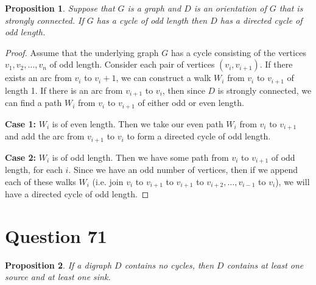 \documentclass[11pt, oneside]{article}   	%
\newtheorem{proposition}{Proposition}
\begin{document}
\begin{proposition}
Suppose that $G$ is a graph and $D$ is an orientation of $G$ that is strongly connected. If $G$ has a cycle of odd length then $D$ has a directed cycle of odd length.
\end{proposition}

\begin{proof}
Assume that the underlying graph $G$ has a cycle consisting of the vertices $v_1, v_2, \ldots, v_n$ of odd length. Consider each pair of vertices $(v_i, v_{i+1})$. If there exists an arc from $v_i$ to $v_i+1$, we can construct a walk $W_i$ from $v_i$ to $v_{i+1}$ of length 1. If there is an arc from $v_{i+1}$ to $v_i$, then since $D$ is strongly connected, we can find a path $W_i$ from $v_i$ to $v_{i+1}$ of either odd or even length.

\textbf{Case 1:} $W_i$ is of even length. Then we take our even path $W_i$ from $v_i$ to $v_{i+1}$ and add the arc from $v_{i+1}$ to $v_i$ to form a directed cycle of odd length.

\textbf{Case 2:} $W_i$ is of odd length. Then we have some path from $v_i$ to $v_{i+1}$ of odd length, for each $i$. Since we have an odd number of vertices, then if we append each of these walks $W_i$ (i.e. join $v_i$ to $v_{i+1}$ to $v_{i+1}$ to $v_{i+2}, \ldots, v_{i-1}$ to $v_i$), we will have a directed cycle of odd length.
\end{proof}

\section*{Question 71}

\begin{proposition}
If a digraph $D$ contains no cycles, then $D$ contains at least one source and at least one sink.
\end{proposition}
\end{document}
